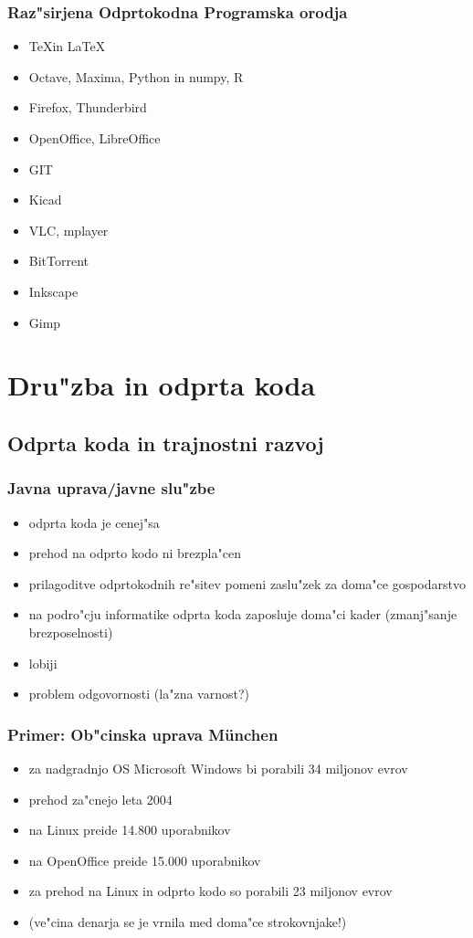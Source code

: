 \documentclass{beamer}
\begin{document}
\begin{frame}
\frametitle{Raz"sirjena Odprtokodna Programska orodja}
\begin{itemize}
\item \TeX in \LaTeX
\item Octave, Maxima, Python in numpy, R
\item Firefox, Thunderbird
\item OpenOffice, LibreOffice
\item GIT
\item Kicad
\item VLC, mplayer
\item BitTorrent
\item Inkscape
\item Gimp
\end{itemize}
\end{frame}

\section{Dru"zba in odprta koda}
\subsection{Odprta koda in trajnostni razvoj}
\begin{frame}
\frametitle{Javna uprava/javne slu"zbe}
\begin{itemize}
\item odprta koda je cenej"sa
\item prehod na odprto kodo ni brezpla"cen
\item prilagoditve odprtokodnih re"sitev pomeni zaslu"zek za doma"ce gospodarstvo
\item na podro"cju informatike odprta koda zaposluje doma"ci kader (zmanj"sanje brezposelnosti)
\item lobiji
\item problem odgovornosti (la"zna varnost?)
\end{itemize}
\end{frame}

\begin{frame}
\frametitle{Primer: Ob"cinska uprava M\"{u}nchen}
\begin{itemize}
\item za nadgradnjo OS Microsoft Windows bi porabili 34 miljonov evrov
\item prehod za"cnejo leta 2004
\item na Linux preide 14.800 uporabnikov
\item na OpenOffice preide 15.000 uporabnikov
\item za prehod na Linux in odprto kodo so porabili 23 miljonov evrov
\item (ve"cina denarja se je vrnila med doma"ce strokovnjake!) 
\end{itemize}
\end{frame}
\end{document}
